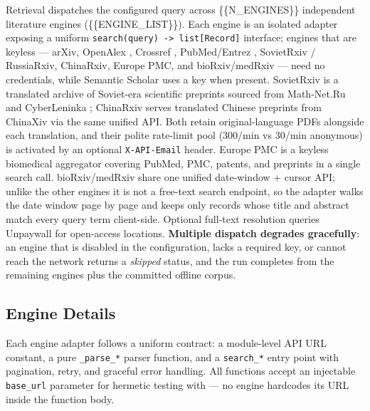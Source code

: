 \documentclass[
]{article}
\begin{document}
Retrieval dispatches the configured query across \{\{N\_ENGINES\}\}
independent literature engines (\{\{ENGINE\_LIST\}\}). Each engine is an
isolated adapter exposing a uniform
\texttt{search(query)\ -\textgreater{}\ list{[}Record{]}} interface;
engines that are keyless --- arXiv, OpenAlex \citep{priem2022openalex},
Crossref \citep{hendricks2020crossref}, PubMed/Entrez
\citep{sayers2022entrez}, SovietRxiv / RussiaRxiv, ChinaRxiv, Europe
PMC, and bioRxiv/medRxiv --- need no credentials, while Semantic Scholar
\citep{kinney2023semantic} uses a key when present. SovietRxiv is a
translated archive of Soviet-era scientific preprints sourced from
Math-Net.Ru and CyberLeninka \citep{sovietrxiv}; ChinaRxiv serves
translated Chinese preprints from ChinaXiv via the same unified API.
Both retain original-language PDFs alongside each translation, and their
polite rate-limit pool (300/min vs 30/min anonymous) is activated by an
optional \texttt{X-API-Email} header. Europe PMC is a keyless biomedical
aggregator covering PubMed, PMC, patents, and preprints in a single
search call. bioRxiv/medRxiv share one unified date-window + cursor API;
unlike the other engines it is not a free-text search endpoint, so the
adapter walks the date window page by page and keeps only records whose
title and abstract match every query term client-side. Optional
full-text resolution queries Unpaywall \citep{piwowar2018state} for
open-access locations. \textbf{Multiple dispatch degrades gracefully}:
an engine that is disabled in the configuration, lacks a required key,
or cannot reach the network returns a \emph{skipped} status, and the run
completes from the remaining engines plus the committed offline corpus.

\subsection{Engine Details}\label{engine-details}

Each engine adapter follows a uniform contract: a module-level API URL
constant, a pure \texttt{\_parse\_*} parser function, and a
\texttt{search\_*} entry point with pagination, retry, and graceful
error handling. All functions accept an injectable \texttt{base\_url}
parameter for hermetic testing with  --- no
engine hardcodes its URL inside the function body.
\end{document}
